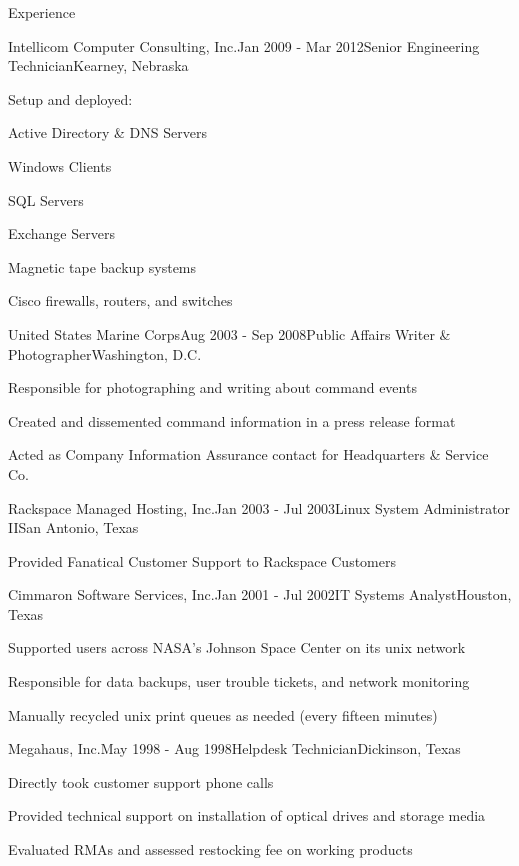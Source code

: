 \documentclass{resume} %
\begin{document}
\begin{rSection}{Experience}
\begin{rSubsection}{Intellicom Computer Consulting, Inc.}{Jan 2009 - Mar 2012}{Senior Engineering Technician}{Kearney, Nebraska}
\item Setup and deployed:
\item Active Directory \& DNS Servers
\item Windows Clients
\item SQL Servers
\item Exchange Servers
\item Magnetic tape backup systems
\item Cisco firewalls, routers, and switches
\end{rSubsection}

\begin{rSubsection}{United States Marine Corps}{Aug 2003 - Sep 2008}{Public Affairs Writer \& Photographer}{Washington, D.C.}
\item Responsible for photographing and writing about command events
\item Created and dissemented command information in a press release format
\item Acted as Company Information Assurance contact for Headquarters \& Service Co.
\end{rSubsection}

\begin{rSubsection}{Rackspace Managed Hosting, Inc.}{Jan 2003 - Jul 2003}{Linux System Administrator II}{San Antonio, Texas}
\item Provided Fanatical Customer Support to Rackspace Customers
\end{rSubsection}

\begin{rSubsection}{Cimmaron Software Services, Inc.}{Jan 2001 - Jul 2002}{IT Systems Analyst}{Houston, Texas}
\item Supported users across NASA's Johnson Space Center on its unix network
\item Responsible for data backups, user trouble tickets, and network monitoring
\item Manually recycled unix print queues as needed (every fifteen minutes)
\end{rSubsection}

\begin{rSubsection}{Megahaus, Inc.}{May 1998 - Aug 1998}{Helpdesk Technician}{Dickinson, Texas}
\item Directly took customer support phone calls
\item Provided technical support on installation of optical drives and storage media 
\item Evaluated RMAs and assessed restocking fee on working products
\end{rSubsection}

\end{rSection}
\end{document}
